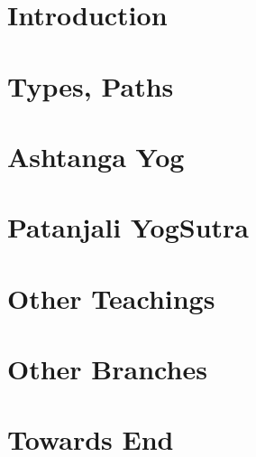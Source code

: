 \section[Intro]{Introduction}


\section[Types]{Types, Paths}


\section[Ashtanga]{Ashtanga Yog}











\section[Patanjali]{Patanjali YogSutra}






\section[Teachings]{Other Teachings}
















\section[Branches]{Other Branches}



%


\section[End]{Towards End}



